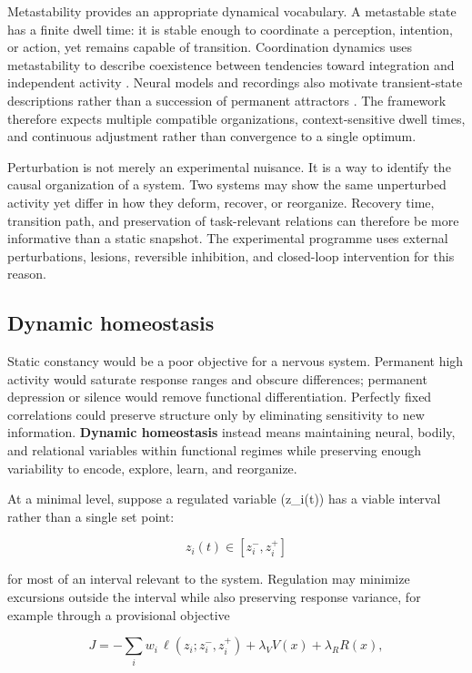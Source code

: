 \documentclass[
  11pt,
  a4paper,
]{article}
\begin{document}
Metastability provides an appropriate dynamical vocabulary. A metastable
state has a finite dwell time: it is stable enough to coordinate a
perception, intention, or action, yet remains capable of transition.
Coordination dynamics uses metastability to describe coexistence between
tendencies toward integration and independent activity
\citep{kelso1995}. Neural models and recordings also motivate
transient-state descriptions rather than a succession of permanent
attractors \citep{rabinovich2008, deco2017}. The framework therefore
expects multiple compatible organizations, context-sensitive dwell
times, and continuous adjustment rather than convergence to a single
optimum.

Perturbation is not merely an experimental nuisance. It is a way to
identify the causal organization of a system. Two systems may show the
same unperturbed activity yet differ in how they deform, recover, or
reorganize. Recovery time, transition path, and preservation of
task-relevant relations can therefore be more informative than a static
snapshot. The experimental programme uses external perturbations,
lesions, reversible inhibition, and closed-loop intervention for this
reason.

\subsection{Dynamic homeostasis}\label{dynamic-homeostasis}

Static constancy would be a poor objective for a nervous system.
Permanent high activity would saturate response ranges and obscure
differences; permanent depression or silence would remove functional
differentiation. Perfectly fixed correlations could preserve structure
only by eliminating sensitivity to new information. \textbf{Dynamic
homeostasis} instead means maintaining neural, bodily, and relational
variables within functional regimes while preserving enough variability
to encode, explore, learn, and reorganize.

At a minimal level, suppose a regulated variable (z\_i(t)) has a viable
interval rather than a single set point:

\[
z_i(t) \in [z_i^{-},z_i^{+}]
\]

for most of an interval relevant to the system. Regulation may minimize
excursions outside the interval while also preserving response variance,
for example through a provisional objective

\[
J = -\sum_i w_i\,\ell\!\left(z_i;z_i^{-},z_i^{+}\right)
    + \lambda_V V(x)
    + \lambda_R R(x),
\]
\end{document}
